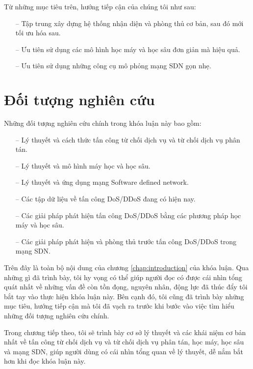 Từ những mục tiêu trên, hướng tiếp cận của chúng tôi như sau:

\begin{itemize}
\item[--] Tập trung xây dựng hệ thống nhận diện và phòng thủ cơ bản, sau đó mới tối ưu hóa sau.
\item[--] Ưu tiên sử dụng các mô hình học máy và học sâu đơn giản mà hiệu quả.
\item[--] Ưu tiên sử dụng những công cụ mô phỏng mạng SDN gọn nhẹ.
\end{itemize}

\section{Đối tượng nghiên cứu}

Những đối tượng nghiên cứu chính trong khóa luận này bao gồm:

\begin{itemize}
\item[--] Lý thuyết và cách thức tấn công từ chối dịch vụ và từ chối dịch vụ phân tán.
\item[--] Lý thuyết và mô hình máy học và học sâu.
\item[--] Lý thuyết và ứng dụng mạng Software defined network.
\item[--] Các tập dữ liệu về tấn công DoS/DDoS đang có hiện nay.
\item[--] Các giải pháp phát hiện tấn công DoS/DDoS bằng các phương pháp học máy và học sâu.
\item[--] Các giải pháp phát hiện và phòng thủ trước tấn công DoS/DDoS trong mạng SDN.
\end{itemize}

Trên đây là toàn bộ nội dung của chương \ref{chap:introduction} của khóa luận. Qua những gì đã trình bày, tôi hy vọng có thể giúp người đọc có được cái nhìn tổng quát nhất về những vấn đề còn tồn đọng, nguyên nhân, động lực đã thúc đẩy tôi bắt tay vào thực hiện khóa luận này. Bên cạnh đó, tôi cũng đã trình bày những mục tiêu, hướng tiếp cận mà tôi đã vạch ra trước khi bước vào việc tìm hiểu những đối tượng nghiên cứu chính.

Trong chương tiếp theo, tôi sẽ trình bày cơ sở lý thuyết và các khái niệm cơ bản nhất về tấn công từ chối dịch vụ và từ chối dịch vụ phân tán, học máy, học sâu và mạng SDN, giúp người dùng có cái nhìn tổng quan về lý thuyết, dễ nắm bắt hơn khi đọc khóa luận này.